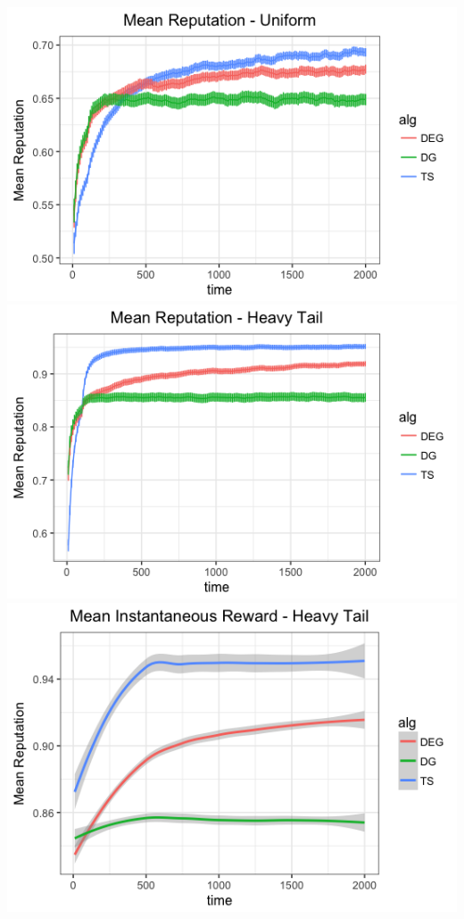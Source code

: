 \documentclass[../competing_bandits_with_appendix.tex]{subfiles}
\begin{document}
\begin{appendices}
\begin{center}
\includegraphics[scale=0.35]{appendix_figures/uniform_mean}
\includegraphics[scale=0.35]{appendix_figures/ht_mean}
\includegraphics[scale=0.35]{appendix_figures/mean_inst_reward_ht}

\end{center}
\end{appendices}
\end{document}

